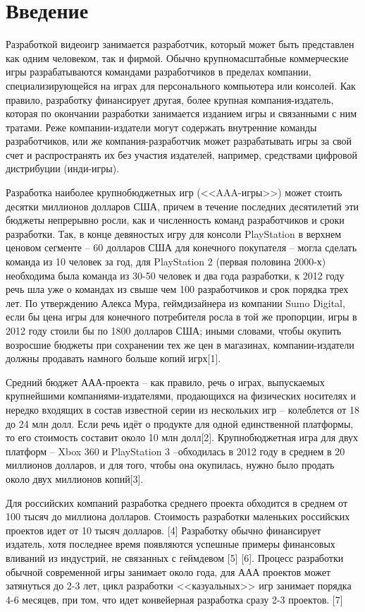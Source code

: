 \chapter{Введение}

Разработкой видеоигр занимается разработчик, который может быть представлен как одним человеком, так и 
фирмой. Обычно крупномасштабные коммерческие игры разрабатываются командами разработчиков в пределах 
компании, специализирующейся на играх для персонального компьютера или консолей. Как правило, разработку 
финансирует другая, более крупная компания-издатель, которая по окончании разработки занимается изданием 
игры и связанными с ним тратами. Реже компании-издатели могут содержать внутренние команды разработчиков, 
или же компания-разработчик может разрабатывать игры за свой счет и распространять их без участия издателей, 
например, средствами цифровой дистрибуции (инди-игры).

Разработка наиболее крупнобюджетных игр (<<AAA-игры>>) может стоить десятки миллионов долларов США, причем в 
течение последних десятилетий эти бюджеты непрерывно росли, как и численность команд разработчиков и сроки 
разработки. Так, в конце девяностых игру для консоли PlayStation в верхнем ценовом сегменте -- 60 долларов 
США для конечного покупателя -- могла сделать команда из 10 человек за год, для PlayStation 2 (первая 
половина 2000-х) необходима была команда из 30-50 человек и два года разработки, к 2012 году речь шла уже 
о командах из свыше чем 100 разработчиков и срок порядка трех лет. По утверждению Алекса Мура, геймдизайнера 
из компании Sumo Digital, если бы цена игры для конечного потребителя росла в той же пропорции, игры в 2012 
году стоили бы по 1800 долларов США; иными словами, чтобы окупить возросшие бюджеты при сохранении тех же 
цен в магазинах, компании-издатели должны продавать намного больше копий игрх[1].

Средний бюджет ААА-проекта -- как правило, речь о играх, выпускаемых крупнейшими компаниями-издателями, 
продающихся на физических носителях и нередко входящих в состав известной серии из нескольких игр -- 
колеблется от 18 до 24 млн долл. Если речь идёт о продукте для одной единственной платформы, то его 
стоимость составит около 10 млн долл[2]. Крупнобюджетная игра для двух платформ -- Xbox 360 и 
PlayStation 3 --обходилась в 2012 году в среднем в 20 миллионов долларов, и для того, чтобы она окупилась, нужно было продать около двух миллионов копий[3].

Для российских компаний разработка среднего проекта обходится в среднем от 100 тысяч до миллиона долларов. 
Стоимость разработки маленьких российских проектов идет от 10 тысяч долларов. [4] Разработку обычно 
финансирует издатель, хотя последнее время появляются успешные примеры финансовых вливаний из индустрий, 
не связанных с геймдевом [5] [6]. Процесс разработки обычной современной игры занимает около года, для ААА 
проектов может затянуться до 2-3 лет, цикл разработки <<казуальных>> игр занимает порядка 4-6 месяцев, при 
том, что идет конвейерная разработка сразу 2-3 проектов. [7]

